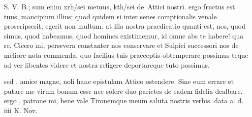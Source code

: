 


 S. V. B.; sum enim xrh/sei me\n tuus, kth/sei de\ Attici nostri. ergo fructus est tuus, mancipium illius; quod quidem si inter senes comptionalis venale proscripserit, egerit non multum. at illa nostra praedicatio quanti est, nos, quod simus, quod habeamus, quod homines existimemur, id omne abs te habere! qua re, Cicero mi, persevera constanter nos conservare et Sulpici successori nos de meliore nota commenda, quo facilius tuis praeceptis obtemperare possimus teque ad ver libentes videre et nostra refigere deportareque tuto possimus.

 sed , amice magne, noli hanc epistulam Attico ostendere. Sine eum errare et putare me virum bonum esse nec solere duo parietes de eadem fidelia dealbare. ergo , patrone mi, bene vale Tironemque meum saluta nostris verbis. data a. d. iiii K. Nov.
